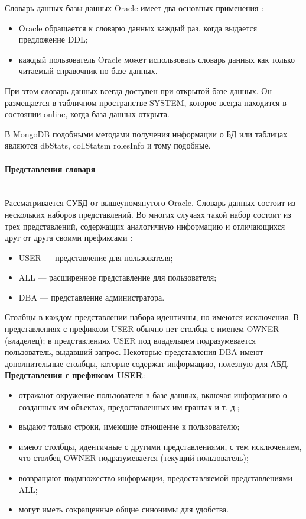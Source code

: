 Словарь данных базы данных Oracle имеет два основных применения \autocite{Kirillov2009}:
\begin{itemize}
\item Oracle обращается к словарю данных каждый раз, когда выдается предложение DDL;
\item каждый пользователь Oracle может использовать словарь данных как
только читаемый справочник по базе данных.
\end{itemize}

При этом словарь данных всегда доступен при открытой базе данных. Он размещается
в табличном пространстве SYSTEM, которое всегда находится в состоянии online,
когда база данных открыта.

В MongoDB подобными методами получения информации о БД или таблицах являются dbStats, collStatsm rolesInfo и тому подобные.\autocite{MongoDocsCommands}

\paragraph{Представления словаря} ~\\

Рассматривается СУБД от вышеупомянутого Oracle. Словарь данных состоит из нескольких наборов представлений. Во многих случаях такой набор состоит из трех представлений, содержащих аналогичную информацию и отличающихся друг от друга своими префиксами \autocite{Kirillov2009}:
\begin{itemize}
\item USER — представление для пользователя;
\item ALL — расширенное представление для пользователя;
\item DBA — представление администратора.
\end{itemize}

Столбцы в каждом представлении набора идентичны, но имеются исключения. В представлениях с префиксом USER обычно нет столбца с именем OWNER
(владелец); в представлениях USER под владельцем подразумевается пользователь, выдавший запрос. Некоторые представления DBA имеют дополнительные столбцы, которые содержат информацию, полезную для АБД. ~\\

\textbf{Представления с префиксом USER}:
\begin{itemize}
\item отражают окружение пользователя в базе данных, включая информацию
о созданных им объектах, предоставленных им грантах и т. д.;
\item выдают только строки, имеющие отношение к пользователю;
\item имеют столбцы, идентичные с другими представлениями, с тем исключением, что столбец OWNER подразумевается (текущий пользователь);
\item возвращают подмножество информации, предоставляемой представлениями ALL;
\item могут иметь сокращенные общие синонимы для удобства.
\end{itemize}

